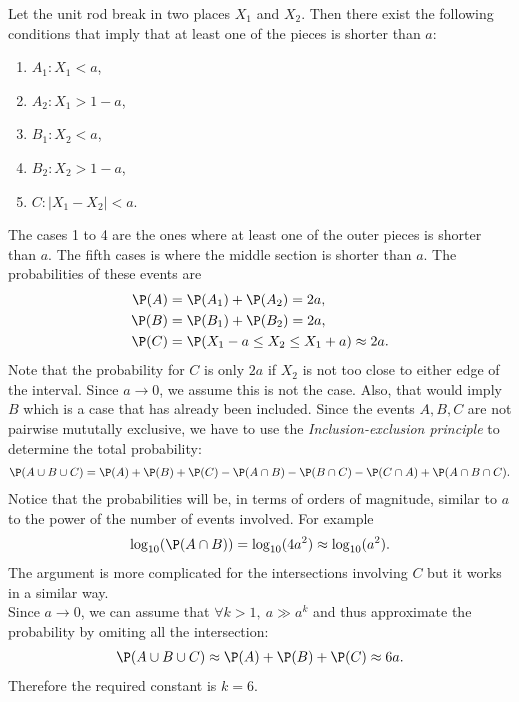 \documentclass{article}
\begin{document}
Let the unit rod break in two places $X_1$ and $X_2$. Then there
exist the following conditions that imply that at least one of the pieces is shorter
than $a$:
\begin{enumerate}
  \item $A_1:X_1<a$,
  \item $A_2:X_1>1-a$,
  \item $B_1:X_2<a$,
  \item $B_2:X_2>1-a$,
  \item $C:|X_1-X_2|<a$.
\end{enumerate}
The cases 1 to 4 are the ones where at least one of the outer
pieces is shorter than $a$. The fifth cases is where the middle section
is shorter than $a$. The probabilities of these events are
\begin{align*}
  \P(A) & = \P(A_1) + \P(A_2) = 2a,                  \\
  \P(B) & = \P(B_1) + \P(B_2) = 2a,                  \\
  \P(C) & = \P(X_1-a\leq X_2 \leq X_1+a) \approx 2a.
\end{align*}
Note that the probability for $C$ is only $2a$ if $X_2$ is not too close to
either edge of the interval. Since $a\to 0$, we assume this is not the case.
Also, that would imply $B$ which is a case that has already been included.
Since the events $A,B,C$ are not pairwise mututally exclusive,
we have to use the \emph{Inclusion-exclusion principle}
to determine the total probability:
\begin{align*}
  \P(A\cup B\cup C) = \P(A) + \P(B) + \P(C) - \P(A \cap B) - \P(B\cap C) - \P(C\cap A) + \P(A\cap B\cap C).
\end{align*}
Notice that the probabilities will be, in terms of orders of magnitude,
similar to $a$ to the power of the number of events involved. For example
\begin{align*}
  \log_{10}(\P(A\cap B)) = \log_{10}(4a^2) \approx \log_{10}(a^2).
\end{align*}
The argument is more complicated for the intersections involving $C$ but
it works in a similar way.\\
Since $a\to 0$, we can assume that $\forall k>1,\:a\gg a^k$ and thus
approximate the probability by omiting all the intersection:
\begin{align*}
  \P(A\cup B\cup C) \approx \P(A) + \P(B) + \P(C) \approx 6a.
\end{align*}
Therefore the required constant is $k=6$.
\end{document}
